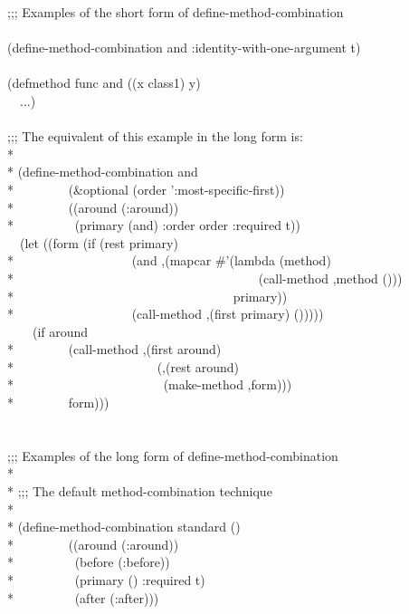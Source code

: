 \begin{defmac}
\begin{lisp}
;;; Examples of the short form of define-method-combination \\
\\
(define-method-combination and :identity-with-one-argument t) \\
\\
(defmethod func and ((x class1) y) \\
~~...) \\
\\
;;; The equivalent of this example in the long form is: \\*
\\*
(define-method-combination and \\*
~~~~~~~~(\&optional (order ':most-specific-first)) \\*
~~~~~~~~((around (:around)) \\*
~~~~~~~~~(primary (and) :order order :required t)) \\
~~(let ((form (if (rest primary) \\*
~~~~~~~~~~~~~~~~~~{\Xbq}(and ,{\Xatsign}(mapcar \#'(lambda (method) \\*
~~~~~~~~~~~~~~~~~~~~~~~~~~~~~~~~~~~~~~{\Xbq}(call-method ,method ())) \\*
~~~~~~~~~~~~~~~~~~~~~~~~~~~~~~~~~~primary)) \\*
~~~~~~~~~~~~~~~~~~{\Xbq}(call-method ,(first primary) ())))) \\
~~~~(if around \\*
~~~~~~~~{\Xbq}(call-method ,(first around) \\*
~~~~~~~~~~~~~~~~~~~~~~(,{\Xatsign}(rest around) \\*
~~~~~~~~~~~~~~~~~~~~~~~(make-method ,form))) \\*
~~~~~~~~form))) \\
\\
\\
;;; Examples of the long form of define-method-combination \\*
\\*
;;; The default method-combination technique \\*
\\*
(define-method-combination standard () \\*
~~~~~~~~((around (:around)) \\*
~~~~~~~~~(before (:before)) \\*
~~~~~~~~~(primary () :required t) \\*
~~~~~~~~~(after (:after))) \\

\end{lisp}
\end{defmac}
